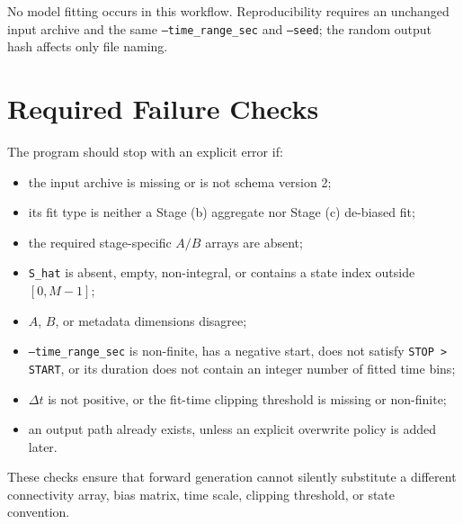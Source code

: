\documentclass[11pt]{article}
\begin{document}
No model fitting occurs in this workflow. Reproducibility requires an
unchanged input archive and the same \texttt{--time\_range\_sec} and
\texttt{--seed}; the random output hash affects only file naming.

\section{Required Failure Checks}
\label{sec:checks}

The program should stop with an explicit error if:
\begin{itemize}
  \item the input archive is missing or is not schema version 2;
  \item its fit type is neither a Stage (b) aggregate nor Stage (c)
        de-biased fit;
  \item the required stage-specific \(A/B\) arrays are absent;
  \item \texttt{S\_hat} is absent, empty, non-integral, or contains a state
        index outside \([0,M-1]\);
  \item \(A\), \(B\), or metadata dimensions disagree;
  \item \texttt{--time\_range\_sec} is non-finite, has a negative start,
        does not satisfy \texttt{STOP > START}, or its duration does not
        contain an integer number of fitted time bins;
  \item \(\Delta t\) is not positive, or the fit-time clipping threshold is
        missing or non-finite;
  \item an output path already exists, unless an explicit overwrite policy
        is added later.
\end{itemize}

These checks ensure that forward generation cannot silently substitute a
different connectivity array, bias matrix, time scale, clipping threshold,
or state convention.
\end{document}
